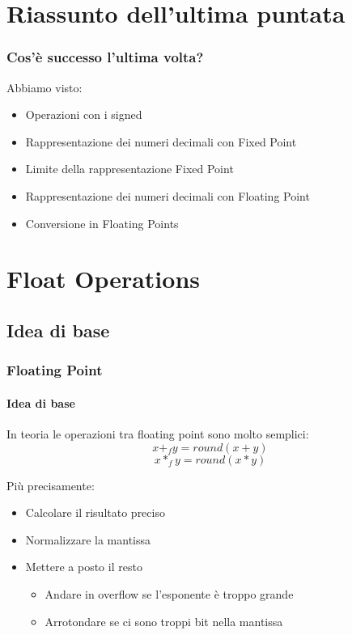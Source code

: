\documentclass{beamer}
\begin{document}
	\section{Riassunto dell'ultima puntata}  
  \begin{frame}
    \frametitle{Cos'è successo l'ultima volta?}
		Abbiamo visto:    
    \begin{itemize}
    		\item Operazioni con i signed
    		\item Rappresentazione dei numeri decimali con Fixed Point
    		\item Limite della rappresentazione Fixed Point
    		\item Rappresentazione dei numeri decimali con Floating Point
    		\item Conversione in Floating Points
    \end{itemize}
  \end{frame}
	
	\section{Float Operations}
	\subsection{Idea di base}
  \begin{frame}
    \frametitle{Floating Point}
    \framesubtitle{Idea di base}
    In teoria le operazioni tra floating point sono molto semplici:
    $$x +_{f} y = round(x + y)$$
    $$x *_{f} y = round(x * y)$$
    
		\vspace{2em}    
    
    Più precisamente:
    \begin{itemize}
    		\item Calcolare il risultato preciso
    		\item Normalizzare la mantissa
    		\item Mettere a posto il resto
    		\begin{itemize}
    			\item Andare in overflow se l'esponente è troppo grande
    			\item Arrotondare se ci sono troppi bit nella mantissa
    		\end{itemize}
    \end{itemize}
  \end{frame}
  
\end{document}

